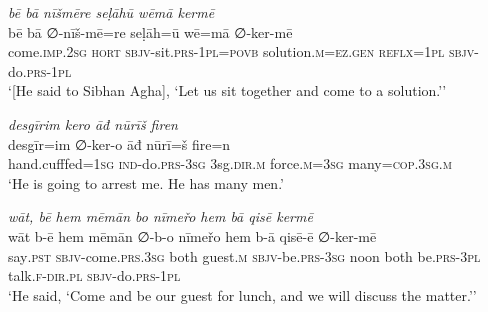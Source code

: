 \ea \label{DP.39}
\textit{bē bā nīšmēre seḷāhū wēmā kermē} \\ 
\gll bē bā ∅-nīš-mē=re seḷāh=ū wē=mā ∅-ker-mē \\ 
 come\textsc{.imp}\textsc{.\textsc{2sg}} \textsc{hort} \textsc{sbjv-}sit\textsc{.prs}\textsc{-1pl}\textsc{=\textsc{povb}} solution\textsc{.m}\textsc{=ez}\textsc{.gen} \textsc{reflx}\textsc{=1pl} \textsc{sbjv-}do\textsc{.prs}\textsc{-1pl} \\ 
\glt `[He said to Sibhan Agha], ‘Let us sit together and come to a solution.’'
\z 
 
\ea \label{DP.41}
\textit{desgīrim kero āđ nūrīš firen} \\ 
\gll desgīr=im ∅-ker-o āđ nūrī=š fire=n \\ 
 hand.cufffed\textsc{=1sg} \textsc{ind-}do\textsc{.prs}\textsc{-3sg} 3sg\textsc{.dir}\textsc{.m} force\textsc{.m}\textsc{=3sg} many\textsc{=cop}\textsc{.3sg}\textsc{.m} \\ 
\glt `He is going to arrest me. He has many men.'
\z 
 
\ea \label{DP.44}
\textit{wāt, bē hem mēmān bo nīmeřo hem bā qisē kermē} \\ 
\gll wāt b-ē hem mēmān ∅-b-o nīmeřo hem b-ā qisē-ē ∅-ker-mē \\ 
 say\textsc{.pst} \textsc{sbjv-}come\textsc{.prs}\textsc{.3sg} both guest\textsc{.m} \textsc{sbjv-}be\textsc{.prs}\textsc{-3sg} noon both be\textsc{.prs}\textsc{-3pl} talk\textsc{\textsc{.f}}\textsc{-dir}\textsc{.pl} \textsc{sbjv-}do\textsc{.prs}\textsc{-1pl} \\ 
\glt `He said, ‘Come and be our guest for lunch, and we will discuss the matter.’'
\z 
 
